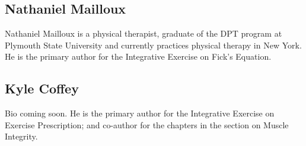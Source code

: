 \subsection*{Nathaniel Mailloux}
Nathaniel Mailloux is a physical therapist, graduate of the DPT program at Plymouth State University and currently practices physical therapy in New York. He is the primary author for the Integrative Exercise on Fick's Equation.

\subsection*{Kyle Coffey}
Bio coming soon. He is the primary author for the Integrative Exercise on Exercise Prescription; and co-author for the chapters in the section on Muscle Integrity.

\printbibliography[heading=subbibintoc]




